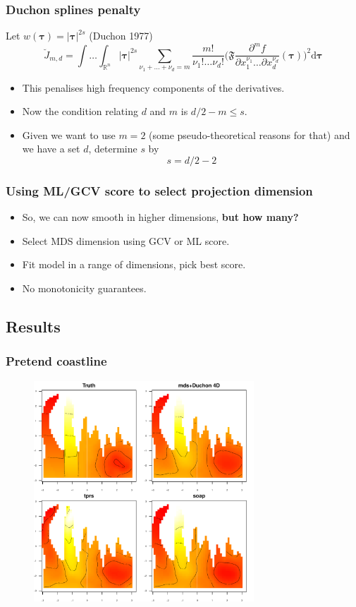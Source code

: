\documentclass[ignorenonframetext]{beamer} %
\newcommand{\bi}{\begin{itemize}}
\newcommand{\ei}{\end{itemize}}
\begin{document}
\begin{frame}
	\frametitle{Duchon splines penalty}
	Let $w(\boldsymbol{\tau})=\lvert \boldsymbol{\tau} \rvert^{2s}$ (Duchon 1977)
	\begin{equation*}
		\breve{J}_{m,d} = \int \ldots \int_{\mathbb{R}^n} \lvert \boldsymbol{\tau} \rvert^{2s} \sum_{\nu_1 + \dots + \nu_d=m} \frac{m!}{\nu_1! \dots \nu_d!}\Big( \mathfrak{F} \frac{\partial^m f}{\partial x_1^{\nu_1} \ldots  \partial x_d^{\nu_d}}(\boldsymbol{\tau}) \Big)^2 \text{d} \boldsymbol{\tau}
	\end{equation*}	
	
	\bi
	\item This penalises high frequency components of the derivatives.
	\item Now the condition relating $d$ and $m$ is $d/2 -m \leq s$.
	\item Given we want to use $m=2$ (some pseudo-theoretical reasons for that) and we have a set $d$, determine $s$ by
	\begin{equation}
		s=d/2-2
	\end{equation}
	\ei
\end{frame}

\begin{frame}
	\frametitle{Using ML/GCV score to select projection dimension}
   \bi
      \item So, we can now smooth in higher dimensions, \textbf{but how many?}
      \item Select MDS dimension using GCV or ML score.
      \item Fit model in a range of dimensions, pick best score.
      \item No monotonicity guarantees.
   \ei
\end{frame}



\subsection{Results}

\begin{frame}
	\frametitle{Pretend coastline}
	\begin{figure}
	\includegraphics[height=3.25in]{figs/wt2-comp.pdf}
	\end{figure}
\end{frame}
\end{document}
